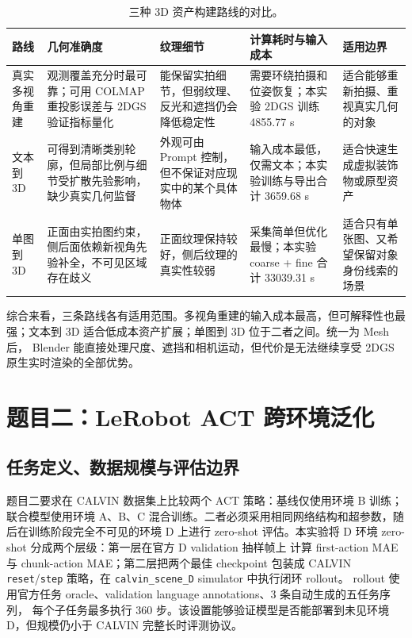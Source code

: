\documentclass[10pt,a4paper,UTF8,fontset=windows]{ctexart}
\newcommand{\code}[1]{\texttt{\small #1}}
\begin{document}
\begin{table}[t]
\centering
\caption{三种 3D 资产构建路线的对比。}
\label{tab:task1-analysis}
\small
\begin{tabularx}{0.98\textwidth}{p{2.1cm}Y Y Y Y}
\toprule
路线 & 几何准确度 & 纹理细节 & 计算耗时与输入成本 & 适用边界 \\
\midrule
真实多视角重建 &
观测覆盖充分时最可靠；可用 COLMAP 重投影误差与 2DGS 验证指标量化 &
能保留实拍细节，但弱纹理、反光和遮挡仍会降低稳定性 &
需要环绕拍摄和位姿恢复；本实验 2DGS 训练 4855.77 s &
适合能够重新拍摄、重视真实几何的对象 \\
文本到 3D &
可得到清晰类别轮廓，但局部比例与细节受扩散先验影响，缺少真实几何监督 &
外观可由 Prompt 控制，但不保证对应现实中的某个具体物体 &
输入成本最低，仅需文本；本实验训练与导出合计 3659.68 s &
适合快速生成虚拟装饰物或原型资产 \\
单图到 3D &
正面由实拍图约束，侧后面依赖新视角先验补全，不可见区域存在歧义 &
正面纹理保持较好，侧后纹理的真实性较弱 &
采集简单但优化最慢；本实验 coarse + fine 合计 33039.31 s &
适合只有单张图、又希望保留对象身份线索的场景 \\
\bottomrule
\end{tabularx}
\end{table}

综合来看，三条路线各有适用范围。多视角重建的输入成本最高，但可解释性也最强；文本到 3D
适合低成本资产扩展；单图到 3D 位于二者之间。统一为 Mesh 后，
Blender 能直接处理尺度、遮挡和相机运动，但代价是无法继续享受 2DGS 原生实时渲染的全部优势。

\clearpage
\section{题目二：LeRobot ACT 跨环境泛化}

\subsection{任务定义、数据规模与评估边界}

题目二要求在 CALVIN 数据集上比较两个 ACT 策略：基线仅使用环境 B 训练；联合模型使用环境
A、B、C 混合训练。二者必须采用相同网络结构和超参数，随后在训练阶段完全不可见的环境 D 上进行
zero-shot 评估。本实验将 D 环境 zero-shot 分成两个层级：第一层在官方 D validation 抽样帧上
计算 first-action MAE 与 chunk-action MAE；第二层把两个最佳 checkpoint 包装成 CALVIN
\code{reset}/\code{step} 策略，在 \code{calvin\_scene\_D} simulator 中执行闭环 rollout。
rollout 使用官方任务 oracle、validation language annotations、3 条自动生成的五任务序列，
每个子任务最多执行 360 步。该设置能够验证模型是否能部署到未见环境 D，但规模仍小于 CALVIN
完整长时评测协议。
\end{document}
